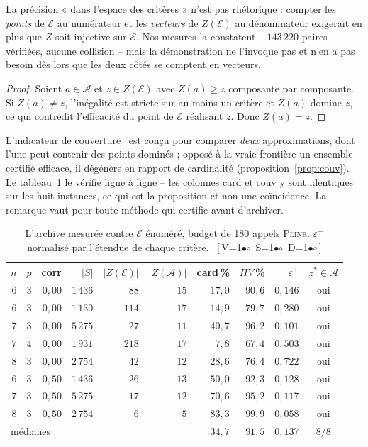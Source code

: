 \documentclass[11pt,a4paper]{article}
\theoremstyle{plain}
\theoremstyle{remark}
\newcommand{\Ecal}{\mathcal{E}}
\newcommand{\ILP}{\textsc{Pline}}
\newcommand{\Acal}{\mathcal{A}}
\newcommand{\cfgm}[1]{\ifnum#1=1$\bullet$\else$\circ$\fi}
\newcommand{\conf}[3]{%
  \textsf{\footnotesize[\,V\cfgm{#1}\ S\cfgm{#2}\ D\cfgm{#3}\,]}}
\begin{document}
\noindent
La précision « dans l'espace des critères » n'est pas rhétorique : compter
les \emph{points} de $\Ecal$ au numérateur et les \emph{vecteurs} de
$Z(\Ecal)$ au dénominateur exigerait en plus que $Z$ soit injective sur
$\Ecal$. Nos mesures la constatent -- $143\,220$ paires vérifiées, aucune
collision -- mais la démonstration ne l'invoque pas et n'en a pas besoin dès
lors que les deux côtés se comptent en vecteurs.

\begin{proof}
Soient $a\in\Acal$ et $z\in Z(\Ecal)$ avec $Z(a)\ge z$ composante par
composante. Si $Z(a)\neq z$, l'inégalité est stricte sur au moins un critère
et $Z(a)$ domine $z$, ce qui contredit l'efficacité du point de $\Ecal$
réalisant $z$. Donc $Z(a)=z$.
\end{proof}

\noindent
L'indicateur de couverture~\cite{zitzler1999} est conçu pour comparer
\emph{deux} approximations, dont l'une peut contenir des points dominés ; opposé à la
vraie frontière un ensemble certifié efficace, il dégénère en rapport de
cardinalité (proposition~\ref{prop:couv}). Le tableau~\ref{tab:livrable} le
vérifie ligne à ligne -- les
colonnes card et couv y sont identiques sur les huit instances, ce qui est
la proposition et non une coïncidence. La remarque vaut pour toute méthode
qui certifie avant d'archiver.

\begin{table}[H]
\centering
\caption{L'archive mesurée contre $\Ecal$ énuméré, budget de 180 appels
\ILP. $\varepsilon^+$ normalisé par l'étendue de chaque critère.\ \conf{1}{1}{1}}
\label{tab:livrable}
\setlength{\tabcolsep}{4.5pt}
\begin{tabular}{rrrrrrrrrc}
\toprule
$n$ & $p$ & corr & $|S|$ & $|Z(\Ecal)|$ & $|Z(\Acal)|$ &
card\,\% & $HV$\,\% & $\varepsilon^+$ & $z^\ast\!\in\!\Acal$\\
\midrule
$6$ & $3$ & $0{,}00$ & $1\,436$ & $88$  & $15$ & $17{,}0$ & $90{,}6$ & $0{,}146$ & oui\\
$6$ & $3$ & $0{,}00$ & $1\,130$ & $114$ & $17$ & $14{,}9$ & $79{,}7$ & $0{,}280$ & oui\\
$7$ & $3$ & $0{,}00$ & $5\,275$ & $27$  & $11$ & $40{,}7$ & $96{,}2$ & $0{,}101$ & oui\\
$7$ & $4$ & $0{,}00$ & $1\,931$ & $218$ & $17$ & $7{,}8$  & $67{,}4$ & $0{,}503$ & oui\\
$8$ & $3$ & $0{,}00$ & $2\,754$ & $42$  & $12$ & $28{,}6$ & $76{,}4$ & $0{,}722$ & oui\\
$6$ & $3$ & $0{,}50$ & $1\,436$ & $26$  & $13$ & $50{,}0$ & $92{,}3$ & $0{,}128$ & oui\\
$7$ & $3$ & $0{,}50$ & $5\,275$ & $17$  & $12$ & $70{,}6$ & $95{,}2$ & $0{,}117$ & oui\\
$8$ & $3$ & $0{,}50$ & $2\,754$ & $6$   & $5$  & $83{,}3$ & $99{,}9$ & $0{,}058$ & oui\\
\midrule
\multicolumn{6}{l}{médianes} & $34{,}7$ & $91{,}5$ & $0{,}137$ & $8/8$\\
\bottomrule
\end{tabular}
\end{table}
\end{document}
